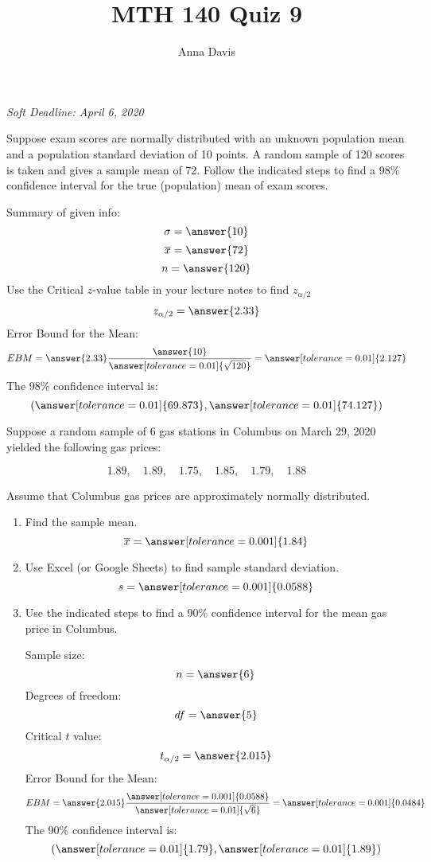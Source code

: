 \documentclass{ximera}
\author{Anna Davis} \title{MTH 140 Quiz 9}
\begin{document}
\begin{abstract}

\end{abstract}
\maketitle
 \textit{Soft Deadline: April 6, 2020}
\begin{problem}\label{prob:140quiz9prob1}
Suppose exam scores are normally distributed with an unknown population mean and a population standard deviation of 10 points. A random sample of 120 scores is taken and gives a sample mean of 72. Follow the indicated steps to find a 98\% confidence interval for the true (population) mean of exam scores.

Summary of given info:
$$\sigma=\answer{10}$$
$$\overline{x}=\answer{72}$$
$$n=\answer{120}$$
Use the Critical $z$-value table in your lecture notes to find $z_{\alpha/2}$
$$z_{\alpha/2}=\answer{2.33}$$
Error Bound for the Mean:
$$EBM=\answer{2.33}\frac{\answer{10}}{\answer[tolerance=0.01]{\sqrt{120}}}=\answer[tolerance=0.01]{2.127}$$
The 98\% confidence interval is:
$$(\answer[tolerance=0.01]{69.873},\answer[tolerance=0.01]{74.127})$$
\end{problem}

\begin{problem}\label{prob:140quiz9prob2}
Suppose a random sample of 6 gas stations in Columbus on March 29, 2020 yielded the following gas prices:

$$1.89,\quad 1.89,\quad 1.75,\quad 1.85,\quad 1.79,\quad 1.88$$

Assume that Columbus gas prices are approximately normally distributed.

\begin{enumerate}
    \item Find the sample mean.
    $$\overline{x}=\answer[tolerance=0.001]{1.84}$$
    \item Use Excel (or Google Sheets) to find sample standard deviation.
    $$s=\answer[tolerance=0.001]{0.0588}$$
   \item Use the indicated steps to find a 90\% confidence interval for the mean gas price in Columbus. 
   
   Sample size:
   $$n=\answer{6}$$
   Degrees of freedom:
   $$df=\answer{5}$$
   Critical $t$ value:
   $$t_{\alpha/2}=\answer{2.015}$$
   Error Bound for the Mean:
   $$EBM=\answer{2.015}\frac{\answer[tolerance=0.001]{0.0588}}{\answer[tolerance=0.01]{\sqrt{6}}}=\answer[tolerance=0.001]{0.0484}$$
   The 90\% confidence interval is:
$$(\answer[tolerance=0.01]{1.79},\answer[tolerance=0.01]{1.89})$$
\end{enumerate}



\end{problem}
\end{document}

